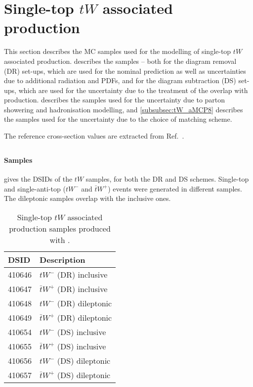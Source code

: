 
\section{Single-top \texorpdfstring{\(tW\)}{tW} associated production}
\label{subsec:tW}

This section describes the MC samples used for the modelling of single-top \(tW\) associated production.
 describes the \POWPY[8] samples -- both for the diagram removal (DR) set-ups,
which are used for the nominal prediction as well as uncertainties due to additional radiation and PDFs,
and for the diagram subtraction (DS) set-ups, which are used for the uncertainty due to the treatment
of the overlap with \ttbar production.
 describes the \POWHER[7] samples used for the uncertainty
due to parton showering and hadronisation modelling, and \cref{subsubsec:tW_aMCP8} describes the
\MGNLOPY[8] samples used for the uncertainty due to the choice of matching scheme.

The reference cross-section values are extracted from Ref.~\cite{LHCTopWGsgtopXsec}.

\subsection[Powheg+Pythia8]{\POWPY[8]}
\label{subsubsec:tW_PP8}

\paragraph{Samples}

 gives the DSIDs of the \(tW\) \POWPY[8] samples, for both the DR and DS schemes.
Single-top and single-anti-top (\(tW^-\) and \(\bar{t}W^+\)) events were generated in different samples.
The dileptonic samples overlap with the inclusive ones.

\begin{table}[htbp]
  \caption{Single-top \(tW\) associated production samples produced with \POWPY[8].}%
  \label{tab:tW_PP8}
  \centering
  \begin{tabular}{l l}
    \toprule
    DSID & Description \\
    \midrule
    410646 & \(tW^-\) (DR) inclusive \\
    410647 & \(\bar{t}W^+\) (DR) inclusive \\
    410648 & \(tW^-\) (DR) dileptonic \\
    410649 & \(\bar{t}W^+\) (DR) dileptonic \\
    \midrule
    410654 & \(tW^-\) (DS) inclusive \\
    410655 & \(\bar{t}W^+\) (DS) inclusive \\
    410656 & \(tW^-\) (DS) dileptonic \\
    410657 & \(\bar{t}W^+\) (DS) dileptonic \\
    \bottomrule
  \end{tabular}
\end{table}

